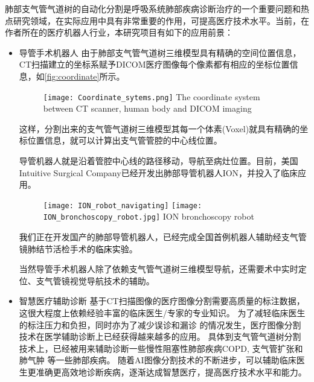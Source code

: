 肺部支气管气道树的自动化分割是呼吸系统肺部疾病诊断治疗的一个重要问题和热点研究领域，在实际应用中具有非常重要的作用，可提高医疗技术水平。当前，在
作者所在的医疗机器人行业，本研究项目有如下的应用前景：
\begin{itemize}
	\item {\heiti 导管手术机器人 }
	由于肺部支气管气道树三维模型具有精确的空间位置信息，CT扫描建立的坐标系赋予DICOM医疗图像每个像素都有相应的坐标位置信息，如\autoref{fig:coordinate}所示。
	\begin{figure}[!htp]
		\centering
		\texttt{[image: Coordinate\_sytems.png]}
			{The coordinate system between CT scanner, human body and DICOM imaging}
		\label{fig:coordinate}
	\end{figure}
	这样，分割出来的支气管气道树三维模型其每一个体素(Voxel)就具有精确的坐标位置信息，就可以计算出支气管管腔的中心线位置。
	
	导管机器人就是沿着管腔中心线的路径移动，导航至病灶位置。目前，美国Intuitive Surgical Company已经开发出肺部导管机器人ION，并投入了临床应用。
	\begin{figure}[!htp]
		\centering
		\texttt{[image: ION\_robot\_navigating]}
		\hspace{2mm}
		\texttt{[image: ION\_bronchoscopy\_robot.jpg]}
			{ION bronchoscopy robot}
		\label{fig:ION_robot}
	\end{figure}
	
	\textcolor{black}{我们}正在开发国产的肺部导管机器人，已经完成全国首例机器人辅助经支气管镜肺结节活检手术\textcolor{black}{的临床实验}。
	
	当然导管手术机器人除了依赖支气管气道树三维模型导航，还需要术中实时定位、支气管镜视觉导航技术的辅助。
	
	
	\item {\heiti 智慧医疗辅助诊断}
	基于CT扫描图像的医疗图像分割需要高质量的标注数据，这很大程度上依赖经验丰富的临床医生/专家的专业知识。 为了减轻临床医生的标注压力和负担，同时亦为了减少误诊和漏诊
	的情况发生，医疗图像分割技术在医学辅助诊断上已经获得越来越多的应用。 具体到支气管气道树分割技术上，已经被用来辅助诊断一些慢性阻塞性肺部疾病COPD, 支气管扩张和肺气肿
	等一些肺部疾病。 随着AI图像分割技术的不断进步，可以辅助临床医生更准确更高效地诊断疾病，逐渐达成智慧医疗，提高医疗技术水平和能力。
\end{itemize}



